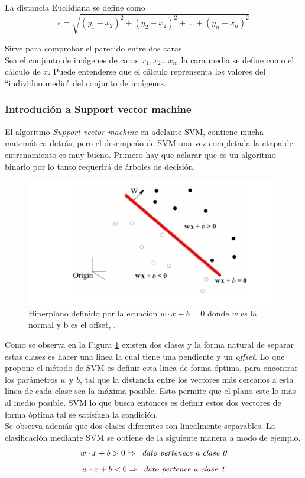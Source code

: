 \documentclass[letterpaper,12pt]{article}
\begin{document}
La distancia Euclidiana se define como
\begin{equation}
\epsilon=\sqrt{(y_{1} -x_{2})^2+(y_{2}-x_{2})^2+...+(y_{n}-x_{n})^2}
\end{equation}

Sirve para comprobar el parecido entre dos caras.\\
Sea el conjunto de imágenes de caras $x_{1}, x_{2}... x_{m}$ la cara media se define como el cálculo de $\bar{x}$. Puede entenderse que el cálculo reprensenta los valores del ``individuo medio" del conjunto de imágenes.
\newpage
\subsubsection{Introdución a Support vector machine }
El algoritmo \textit{Support vector machine} en adelante SVM, contiene mucha matemática detrás, pero el desempeño de SVM una vez completada la etapa de entrenamiento es muy bueno. Primero hay que aclarar que es un algoritmo binario por lo tanto requerirá de árboles de decisión. 


\begin{figure}[H]
\centering
\includegraphics[scale=0.8]{Figs/SVM01.png}
\caption{Hiperplano definido por la ecuación $w\cdot x + b=0$ donde $w$ es la normal y b es el offset, \cite{SebastianGodoy}.}
\label{fig:SVM01}
\end{figure}

Como se observa en la Figura \ref{fig:SVM01} existen dos clases y la forma natural de separar estas clases es hacer una línea la cual tiene una pendiente y un \textit{offset}. Lo que propone el método de SVM es definir esta línea de forma óptima, para encontrar los parámetros $w$ y $b$, tal que la distancia entre los vectores más cercanos a esta línea de cada clase sea la máxima posible. Esto permite que el plano este lo más al medio posible. SVM lo que busca entonces es definir estos dos vectores de forma óptima tal se satisfaga la condición.\\
Se observa además que dos clases diferentes son linealmente separables. La clasificación mediante SVM se obtiene de la siguiente manera a modo de ejemplo.
\begin{equation}
w\cdot x +b > 0 \Rightarrow \hspace{0.5em}  \emph{dato pertenece a clase 0}
\end{equation}
\begin{equation}
w\cdot x +b < 0 \Rightarrow \hspace{0.5em} \emph{dato pertence a clase 1}
\end{equation}
\end{document}

